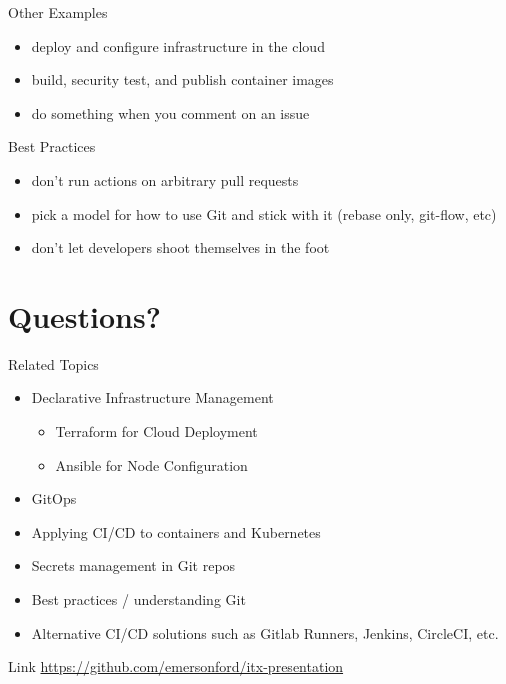 \documentclass{beamer}
\begin{document}
\begin{frame}{Other Examples}
    \begin{itemize}
        \item deploy and configure infrastructure in the cloud
        \item build, security test, and publish container images
        \item do something when you comment on an issue
    \end{itemize}
\end{frame}

\begin{frame}{Best Practices}
    \begin{itemize}
        \item don't run actions on arbitrary pull requests
        \item pick a model for how to use Git and stick with it (rebase only, git-flow, etc)
        \item don't let developers shoot themselves in the foot
    \end{itemize}
\end{frame}

\section{Questions?}

\begin{frame}{Related Topics}
    \begin{itemize}
        \item Declarative Infrastructure Management
            \begin{itemize}
                \item Terraform for Cloud Deployment
                \item Ansible for Node Configuration
            \end{itemize}
        \item GitOps
        \item Applying CI/CD to containers and Kubernetes
        \item Secrets management in Git repos
        \item Best practices / understanding Git
        \item Alternative CI/CD solutions such as Gitlab Runners, Jenkins, CircleCI, etc.
    \end{itemize}
\end{frame}

\begin{frame}{Link}
    \url{https://github.com/emersonford/itx-presentation}
\end{frame}
\end{document}
